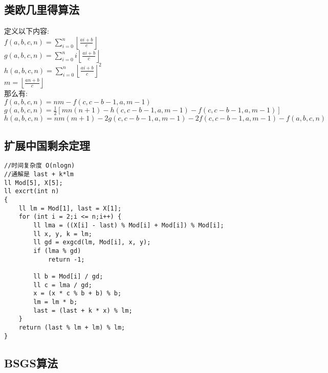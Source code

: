 \documentclass[twocolumn,a4]{article}
\begin{document}
\subsection{类欧几里得算法}
定义以下内容: \\
$\displaystyle f(a,b,c,n)=\sum_{i=0}^{n}\left\lfloor \frac{ai+b}{c} \right\rfloor$\\
$\displaystyle g(a,b,c,n)=\sum_{i=0}^{n}i\left\lfloor \frac{ai+b}{c} \right\rfloor$\\
$\displaystyle h(a,b,c,n)=\sum_{i=0}^{n}{\left\lfloor \frac{ai+b}{c} \right\rfloor}^2$\\
$\displaystyle m=\left \lfloor \frac{an+b}{c} \right \rfloor$\\
那么有: \\
$f(a,b,c,n)=nm-f(c,c-b-1,a,m-1)$\\
$g(a,b,c,n)=\frac{1}{2}[mn(n+1)-h(c,c-b-1,a,m-1)-f(c,c-b-1,a,m-1)]$\\
$h(a,b,c,n)=nm(m+1)-2g(c,c-b-1,a,m-1)-2f(c,c-b-1,a,m-1)-f(a,b,c,n)$

\subsection{扩展中国剩余定理}
\begin{lstlisting}
//时间复杂度 O(nlogn)
//通解是 last + k*lm
ll Mod[5], X[5];
ll excrt(int n)
{
    ll lm = Mod[1], last = X[1];
    for (int i = 2;i <= n;i++) {
        ll lma = ((X[i] - last) % Mod[i] + Mod[i]) % Mod[i];
        ll x, y, k = lm;
        ll gd = exgcd(lm, Mod[i], x, y);
        if (lma % gd)
            return -1;

        ll b = Mod[i] / gd;
        ll c = lma / gd;
        x = (x * c % b + b) % b;
        lm = lm * b;
        last = (last + k * x) % lm;
    }
    return (last % lm + lm) % lm;
}
\end{lstlisting}

\subsection{BSGS算法}
\begin{lstlisting}

\end{lstlisting}
\end{document}
